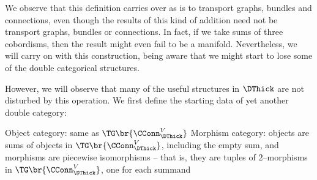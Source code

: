 \begin{rmk}
We observe that this definition carries over as is to transport graphs, bundles
and connections, even though the results of this kind of addition need not be
transport graphs, bundles or connections. In fact, if we take sums of three
cobordisms, then the result might even fail to be a manifold.
 Nevertheless, we will carry on with this
construction, being aware that we might start to lose some of the double
categorical structures.
\end{rmk}

However, we will observe that many of the useful structures in $\DThick$ are not
disturbed by this operation. We first define the starting data of yet another
double category:

\begin{enmrt}
\li Object category: same as $\TG\br{\CConn^V_{\DThick}}$
\li Morphism category: objects are sums of objects in
$\TG\br{\CConn^V_{\DThick}}$, including the empty sum, and morphisms are
piecewise isomorphisms -- that is, they are tuples of $2$--morphisms in
$\TG\br{\CConn^V_{\DThick}}$, one for each summand
\end{enmrt}

